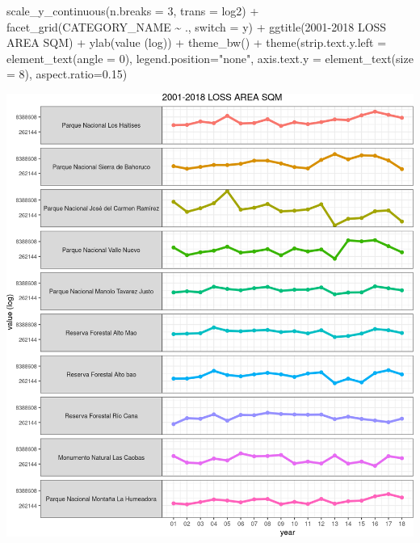 \documentclass[10pt,landscape,a3paper]{article}
\newenvironment{Shaded}{\begin{snugshade}}{\end{snugshade}}
\newcommand{\AttributeTok}[1]{\textcolor[rgb]{0.77,0.63,0.00}{#1}}
\newcommand{\DecValTok}[1]{\textcolor[rgb]{0.00,0.00,0.81}{#1}}
\newcommand{\FloatTok}[1]{\textcolor[rgb]{0.00,0.00,0.81}{#1}}
\newcommand{\FunctionTok}[1]{\textcolor[rgb]{0.00,0.00,0.00}{#1}}
\newcommand{\NormalTok}[1]{#1}
\newcommand{\SpecialCharTok}[1]{\textcolor[rgb]{0.00,0.00,0.00}{#1}}
\newcommand{\StringTok}[1]{\textcolor[rgb]{0.31,0.60,0.02}{#1}}
\begin{document}
\begin{Shaded}
\begin{Highlighting}[]
  \FunctionTok{scale\_y\_continuous}\NormalTok{(}\AttributeTok{n.breaks =} \DecValTok{3}\NormalTok{, }\AttributeTok{trans =} \StringTok{\textquotesingle{}log2\textquotesingle{}}\NormalTok{) }\SpecialCharTok{+}
  \FunctionTok{facet\_grid}\NormalTok{(CATEGORY\_NAME }\SpecialCharTok{\textasciitilde{}}\NormalTok{ ., }\AttributeTok{switch =} \StringTok{\textquotesingle{}y\textquotesingle{}}\NormalTok{) }\SpecialCharTok{+}
  \FunctionTok{ggtitle}\NormalTok{(}\StringTok{\textquotesingle{}2001{-}2018 LOSS AREA SQM\textquotesingle{}}\NormalTok{) }\SpecialCharTok{+}
  \FunctionTok{ylab}\NormalTok{(}\StringTok{\textquotesingle{}value (log)\textquotesingle{}}\NormalTok{) }\SpecialCharTok{+}
  \FunctionTok{theme\_bw}\NormalTok{() }\SpecialCharTok{+}
  \FunctionTok{theme}\NormalTok{(}\AttributeTok{strip.text.y.left =} \FunctionTok{element\_text}\NormalTok{(}\AttributeTok{angle =} \DecValTok{0}\NormalTok{), }\AttributeTok{legend.position=}\StringTok{"none"}\NormalTok{,}
        \AttributeTok{axis.text.y =} \FunctionTok{element\_text}\NormalTok{(}\AttributeTok{size =} \DecValTok{8}\NormalTok{), }\AttributeTok{aspect.ratio=}\FloatTok{0.15}\NormalTok{)}
\end{Highlighting}
\end{Shaded}

\begin{center}\includegraphics{img/data-download-preparation-eda/zonal-pa-5} \end{center}
\end{document}

